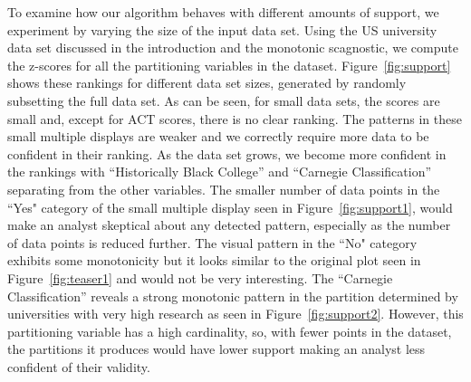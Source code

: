 To examine how our algorithm behaves with different amounts of support, we experiment by varying the size of the input data set. Using the US university data set discussed in the introduction and the monotonic scagnostic, we compute the z-scores for all the partitioning variables in the dataset. Figure~\ref{fig:support} shows these rankings for different data set sizes, generated by randomly subsetting the full data set.
As can be seen, for small data sets, the scores are small and, except for ACT scores, there is no clear ranking. The patterns in these small multiple displays are weaker and we correctly require more data to be confident in their ranking. As the data set grows, we become more confident in the rankings with ``Historically Black College'' and ``Carnegie Classification'' separating from the other variables. 
The smaller number of data points in the ``Yes" category of the small multiple display seen in Figure~\ref{fig:support1}, would make an analyst skeptical about any detected pattern, especially as the number of data points is reduced further. The visual pattern in the ``No" category exhibits some monotonicity but it looks similar to the original plot seen in Figure~\ref{fig:teaser1} and would not be very interesting.
The ``Carnegie Classification'' reveals a strong monotonic pattern in the partition determined by universities with very high research as seen in Figure~\ref{fig:support2}. However, this partitioning variable has a high cardinality, so, with fewer points in the dataset, the partitions it produces would have lower support making an analyst less confident of their validity.

